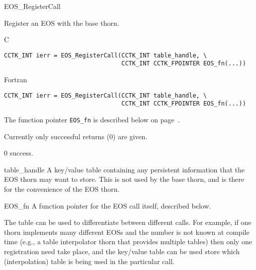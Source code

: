 \begin{FunctionDescription}{EOS\_RegisterCall}
  \label{Whisky_Dev_EOSBase_General_EOS_RegisterCall}  
  
  Register an EOS with the base thorn.

  \begin{SynopsisSection}
    \begin{Synopsis}{C}
\begin{verbatim}
CCTK_INT ierr = EOS_RegisterCall(CCTK_INT table_handle, \
                                 CCTK_INT CCTK_FPOINTER EOS_fn(...))
\end{verbatim}
    \end{Synopsis}
    \begin{Synopsis}{Fortran}
\begin{verbatim}
CCTK_INT ierr = EOS_RegisterCall(CCTK_INT table_handle, \
                                 CCTK_INT CCTK_FPOINTER EOS_fn(...))
\end{verbatim}
    \end{Synopsis}
  \end{SynopsisSection}

  \begin{ResultSection}
    \begin{ResultNote}
      The function pointer {\tt EOS\_fn} is described below on
      page~\pageref{Whiskty_Dev_EOSBase_General_EOS_fn}.  

      Currently only successful returns (0) are given.
    \end{ResultNote}
    \begin{Result}{\rm 0}
      success.
    \end{Result}
  \end{ResultSection}

  \begin{ParameterSection}
    \begin{Parameter}{table\_handle}
      A key/value table containing any persistent information that the
      EOS thorn may want to store. This is not used by the base thorn,
      and is there for the convenience of the EOS thorn.
    \end{Parameter}
    \begin{Parameter}{EOS\_fn}
      A function pointer for the EOS call itself, described below.
    \end{Parameter}
  \end{ParameterSection}

  \begin{Discussion}
    The table can be used to differentiate between different
    calls. For example, if one thorn implements many different
    EOSs and the number is not known at compile time (e.g., a table
    interpolator thorn that provides multiple tables) then only one
    registration need take place, and the key/value table can be used
    store which (interpolation) table is being used in the particular
    call. 
  \end{Discussion}


\end{FunctionDescription}
